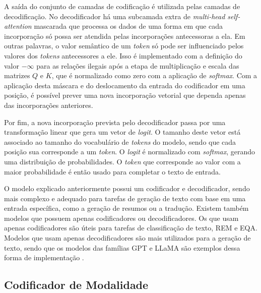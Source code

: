 A saída do conjunto de camadas de codificação é utilizada pelas camadas de decodificação. No decodificador há uma
subcamada extra de \textit{multi-head self-attention} mascarada que processa os dados de uma forma em que cada
incorporação só possa ser atendida pelas incorporações antecessoras a ela. Em outras palavras, o valor semântico de um
\textit{token} só pode ser influenciado pelos valores dos \textit{tokens} antecessores a ele. Isso é implementado com a
definição do valor
\begin{math}-\infty\end{math} para as relações ilegais após a etapa de multiplicação e escala das matrizes
\begin{math}Q\end{math} e \begin{math}K\end{math}, que é
normalizado como zero com a aplicação de \textit{softmax}. Com a aplicação desta máscara e do deslocamento da entrada
do codificador em uma posição, é possível prever
uma nova incorporação vetorial que dependa apenas das incorporações anteriores.

Por fim, a nova incorporação prevista pelo decodificador passa por uma transformação linear que gera um vetor de
\textit{logit}. O tamanho deste vetor está associado ao tamanho do vocabulário de \textit{tokens} do modelo, sendo que
cada posição sua corresponde a um \textit{token}. O \textit{logit} é normalizado com \textit{softmax}, gerando uma
distribuição de probabilidades. O \textit{token} que corresponde ao valor com a maior probabilidade é então usado para
completar o texto de entrada.


O modelo explicado anteriormente possui um codificador e decodificador, sendo mais complexo e adequado para tarefas de
geração de texto com base em uma entrada específica, como a geração de resumos ou a tradução. Existem também modelos
que possuem apenas codificadores ou decodificadores. Os que usam apenas codificadores são úteis para tarefas de
classificação de texto, \ac{REM} e \ac{EQA}. Modelos que usam apenas decodificadores são mais utilizados para a geração
de texto, sendo que os modelos das famílias \ac{GPT} e \ac{LLaMA} são exemplos dessa forma de implementação
\cite{llm_survey_2024}.

\subsection{Codificador de Modalidade}

